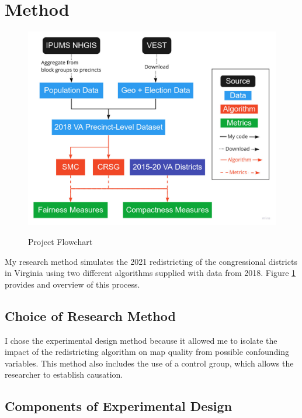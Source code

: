 \section{Method}
\label{sec:method}

\begin{figure}
    \centering
    \caption{Project Flowchart}
    \includegraphics[width=\linewidth]{img/flowchart.pdf}
    \label{fig:flowchart}
    \raggedright
\end{figure}  

My research method simulates the 2021 redistricting of the congressional districts in Virginia using two different algorithms supplied with data from 2018. Figure \ref{fig:flowchart} provides and overview of this process.

\subsection{Choice of Research Method}

I chose the experimental design method because it allowed me to isolate the impact of the redistricting algorithm on map quality from possible confounding variables. This method also includes the use of a control group, which allows the researcher to establish causation. 

\subsection{Components of Experimental Design}

